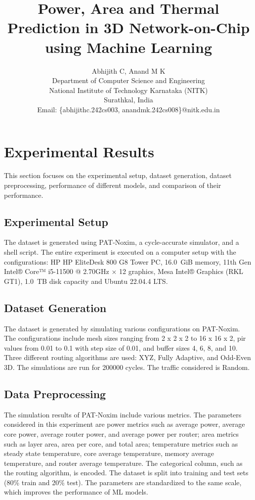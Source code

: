 \documentclass[conference]{IEEEtran}
\begin{document}
	
	\title{Power, Area and Thermal Prediction in 3D Network-on-Chip using Machine Learning}
	
	\author{Abhijith C, Anand M K \\
		
		Department of Computer Science and Engineering \\ 
		National Institute of Technology Karnataka (NITK) \\ 
		Surathkal, India\\
		Email: \{abhijithc.242cs003, anandmk.242cs008\}@nitk.edu.in}
	
	
	\maketitle
	
\section{Experimental Results}
This section focuses on the experimental setup, dataset generation, dataset preprocessing, performance of different models, and comparison of their performance.

	\subsection{Experimental Setup}
	The dataset is generated using PAT-Noxim, a cycle-accurate simulator, and a shell script. The entire experiment is executed on a computer setup with the configurations: HP HP EliteDesk 800 G8 Tower PC, 16.0 GiB memory, 11th Gen Intel® Core™ i5-11500 @ 2.70GHz × 12 graphics, Mesa Intel® Graphics (RKL GT1), 1.0 TB disk capacity and Ubuntu 22.04.4 LTS.
	
	\subsection{Dataset Generation}
	The dataset is generated by simulating various configurations on PAT-Noxim. The configurations include mesh sizes ranging from 2 x 2 x 2 to  16 x 16 x 2, pir values from 0.01 to 0.1 with step size of 0.01, and buffer sizes 4, 6, 8, and 10. Three different routing algorithms are used: XYZ, Fully Adaptive, and Odd-Even 3D. The simulations are run for 200000 cycles. The traffic considered is Random.

	\subsection{Data Preprocessing}
	The simulation results of PAT-Noxim include various metrics. The parameters considered in this experiment are power metrics such as average power, average core power, average router power, and average power per router; area metrics such as layer area, area per core, and total area; temperature metrics such as steady state temperature, core average temperature, memory average temperature, and router average temperature. The categorical column, such as the routing algorithm, is encoded. The dataset is split into training and test sets (80\% train and 20\% test). The parameters are standardized to the same scale, which improves the performance of ML models.
\end{document}
